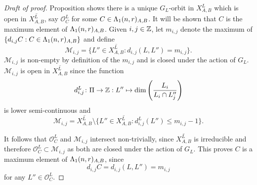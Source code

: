\documentclass[a4paper, 11pt]{report}
\begin{document}
\begin{proof}[Draft of proof]
Proposition \needsreference shows there is a unique $G_L$-orbit in $X_{A,B}^L$ which is open in $\overline{X_{A,B}^L}$, say $\mathcal{O}_C^L$ for some $C\in\Lambda_1(n,r)_{A,B}$. It will be shown that $C$ is the maximum element of $\Lambda_1(n,r)_{A,B}$. Given $i,j\in\mathbb{Z}$, let $m_{i,j}$ denote the maximum of $\{d_{i,j}C: C\in\Lambda_1(n,r)_{A,B}\}$ and define
\begin{equation*}
\mathcal{M}_{i,j} = \{L''\in \overline{X_{A,B}^L}: d_{i,j}(L,L'') = m_{i,j}\}.
\end{equation*}
$\mathcal{M}_{i,j}$ is non-empty by definition of the $m_{i,j}$ and is closed under the action of $G_L$. $\mathcal{M}_{i,j}$ is open in $\overline{X_{A,B}^L}$ since the function
\begin{equation*}
d_{i,j}^L\colon\Pi\to\mathbb{Z}: L''\mapsto \dim\left(\frac{L_i}{L_i\cap L_j''}\right)
\end{equation*}
is lower semi-continuous \needsreference and
\begin{equation*}
\mathcal{M}_{i,j} = \overline{X_{A,B}^L}\setminus \{L''\in\overline{X_{A,B}^L}: d_{i,j}^L(L'')\le m_{i,j} -1\}.
\end{equation*}

It follows that $\mathcal{O}_C^L$ and $\mathcal{M}_{i,j}$ intersect non-trivially, since $\overline{X_{A,B}^L}$ is irreducible and therefore $\mathcal{O}_C^L\subset \mathcal{M}_{i,j}$ as both are closed under the action of $G_L$. This proves $C$ is a maximum element of $\Lambda_1(n,r)_{A,B}$, since
\begin{equation*}
d_{i,j}C = d_{i,j}(L,L'') = m_{i,j}
\end{equation*}
for any $L''\in\mathcal{O}_C^L$.
\end{proof}
\end{document}

